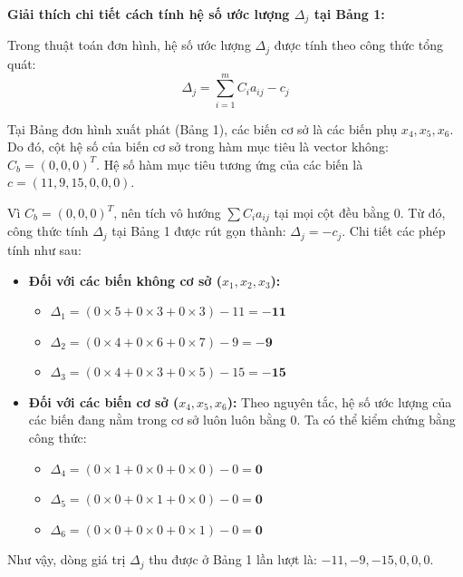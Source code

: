 \vspace{0.3cm}
\textbf{Giải thích chi tiết cách tính hệ số ước lượng $\Delta_j$ tại Bảng 1:}

Trong thuật toán đơn hình, hệ số ước lượng $\Delta_j$ được tính theo công thức tổng quát:
\begin{equation*}
    \Delta_j = \sum_{i=1}^{m} C_i a_{ij} - c_j
\end{equation*}

Tại Bảng đơn hình xuất phát (Bảng 1), các biến cơ sở là các biến phụ $x_4, x_5, x_6$. Do đó, cột hệ số của biến cơ sở trong hàm mục tiêu là vector không: $C_b = (0, 0, 0)^T$. 
Hệ số hàm mục tiêu tương ứng của các biến là $c = (11, 9, 15, 0, 0, 0)$.

Vì $C_b = (0, 0, 0)^T$, nên tích vô hướng $\sum C_i a_{ij}$ tại mọi cột đều bằng $0$. Từ đó, công thức tính $\Delta_j$ tại Bảng 1 được rút gọn thành: $\Delta_j = - c_j$. Chi tiết các phép tính như sau:

\begin{itemize}
    \item \textbf{Đối với các biến không cơ sở ($x_1, x_2, x_3$):}
    \begin{itemize}
        \item $\Delta_1 = (0 \times 5 + 0 \times 3 + 0 \times 3) - 11 = \mathbf{-11}$
        \item $\Delta_2 = (0 \times 4 + 0 \times 6 + 0 \times 7) - 9 = \mathbf{-9}$
        \item $\Delta_3 = (0 \times 4 + 0 \times 3 + 0 \times 5) - 15 = \mathbf{-15}$
    \end{itemize}
    
    \item \textbf{Đối với các biến cơ sở ($x_4, x_5, x_6$):} 
    Theo nguyên tắc, hệ số ước lượng của các biến đang nằm trong cơ sở luôn luôn bằng $0$. Ta có thể kiểm chứng bằng công thức:
    \begin{itemize}
        \item $\Delta_4 = (0 \times 1 + 0 \times 0 + 0 \times 0) - 0 = \mathbf{0}$
        \item $\Delta_5 = (0 \times 0 + 0 \times 1 + 0 \times 0) - 0 = \mathbf{0}$
        \item $\Delta_6 = (0 \times 0 + 0 \times 0 + 0 \times 1) - 0 = \mathbf{0}$
    \end{itemize}
\end{itemize}

Như vậy, dòng giá trị $\Delta_j$ thu được ở Bảng 1 lần lượt là: $-11, -9, -15, 0, 0, 0$.

